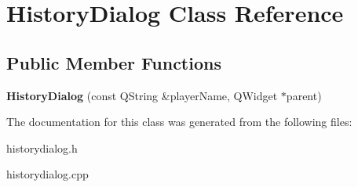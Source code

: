 \hypertarget{classHistoryDialog}{
\section{HistoryDialog Class Reference}
\label{classHistoryDialog}
}
\subsection*{Public Member Functions}
\begin{DoxyCompactItemize}
\item 
\hypertarget{classHistoryDialog_a6eb066b151684513be8f50ae4cf5f79f}{
{\bfseries HistoryDialog} (const QString \&playerName, QWidget $\ast$parent)}
\label{classHistoryDialog_a6eb066b151684513be8f50ae4cf5f79f}

\end{DoxyCompactItemize}


The documentation for this class was generated from the following files:\begin{DoxyCompactItemize}
\item 
historydialog.h\item 
historydialog.cpp\end{DoxyCompactItemize}
